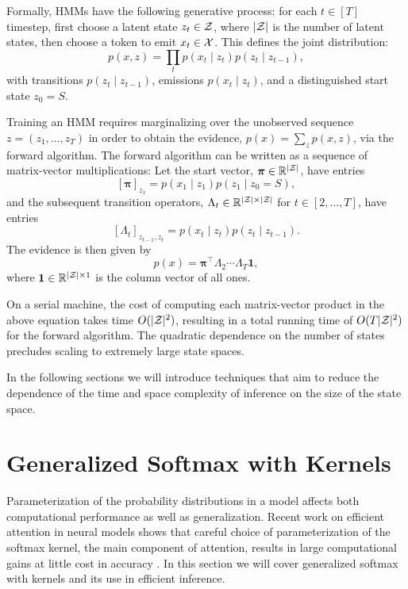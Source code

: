\documentclass{article}
\begin{document}
Formally, HMMs have the following generative process:
for each $t \in [T]$ timestep, first choose a latent state $z_t \in \mathcal{Z}$,
where $|\mathcal{Z}|$ is the number of latent states,
then choose a token to emit $x_t \in \mathcal{X}$.
This defines the joint distribution:
\begin{equation}
\label{eqn:joint}
p(x,z) = \prod_t p(x_t\mid z_t) p(z_t \mid z_{t-1}),
\end{equation}
with transitions $p(z_t \mid z_{t-1})$, emissions $p(x_t \mid z_t)$,
and a distinguished start state $z_0 = S$.

Training an HMM requires marginalizing over the unobserved
sequence $z = (z_1,\ldots,z_T)$ in order to obtain the evidence, $p(x) = \sum_z p(x,z)$,
via the forward algorithm.
The forward algorithm can be written as a sequence of matrix-vector multiplications:
Let the start vector, $\bm\pi\in\mathbb{R}^{|\mathcal{Z}|}$, have entries
\begin{equation}
\label{eqn:start}
[\bm\pi]_{z_1} = p(x_1 \mid z_1) p(z_1 \mid z_0=S),
\end{equation}
and the subsequent transition operators, $\Lambda_t\in\mathbb{R}^{|\mathcal{Z}|\times|\mathcal{Z}|}$ for $t\in[2,\ldots,T]$, 
have entries
\begin{equation}
\label{eqn:trans}
[\Lambda_t]_{z_{t-1},z_{t}} = p(x_t\mid z_t)p(z_t\mid z_{t-1}).
\end{equation}
The evidence is then given by
\begin{equation}
\label{eqn:evidence}
p(x) = \bm\pi^\top\Lambda_2\cdots\Lambda_T\mathbf{1},
\end{equation}
where $\mathbf{1}\in\mathbb{R}^{|\mathcal{Z}|\times1}$ is the column vector of all ones.

On a serial machine, the cost of computing each matrix-vector product in
the above equation takes time $O(|\mathcal{Z}|^2)$, resulting in a total
running time of $O(T|\mathcal{Z}|^2)$ for the forward algorithm.
The quadratic dependence on the number of states precludes
scaling to extremely large state spaces.

In the following sections we will introduce techniques that
aim to reduce the dependence of the time and space complexity
of inference on the size of the state space.

\section{Generalized Softmax with Kernels}
Parameterization of the probability distributions in a model affects both
computational performance as well as generalization.
Recent work on efficient attention in neural models shows that careful choice of parameterization
of the softmax kernel, the main component of attention,
results in large computational gains at little cost in accuracy
\citep{choromanski2020performer,peng2021rfa}.
In this section we will cover generalized softmax with kernels and 
its use in efficient inference.
\end{document}
